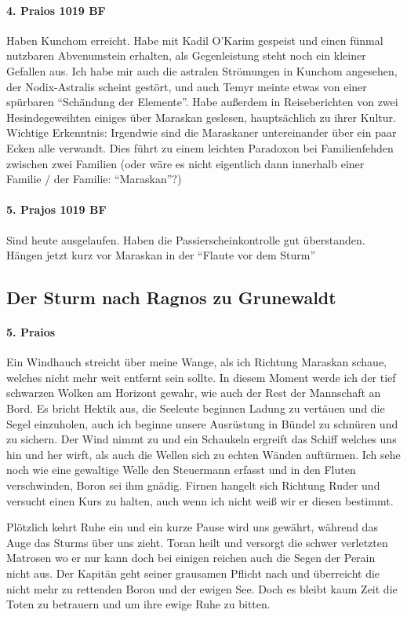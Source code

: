 \paragraph{4. Praios 1019 BF}
Haben Kunchom erreicht. Habe mit Kadil O'Karim gespeist und einen fünmal nutzbaren Abvenumstein erhalten, als Gegenleistung steht noch ein kleiner Gefallen aus.
Ich habe mir auch die astralen Strömungen in Kunchom angesehen, der Nodix-Astralis scheint gestört, und auch Temyr meinte etwas von einer spürbaren ``Schändung der Elemente''.
Habe außerdem in Reiseberichten von zwei Hesindegeweihten einiges über Maraskan geslesen, hauptsächlich zu ihrer Kultur. Wichtige Erkenntnis: Irgendwie sind die Maraskaner untereinander über ein paar Ecken alle verwandt. Dies führt zu einem leichten Paradoxon bei Familienfehden zwischen zwei Familien (oder wäre es nicht eigentlich dann innerhalb einer Familie / der Familie: ``Maraskan''?)

\paragraph{5. Prajos 1019 BF}
Sind heute ausgelaufen. Haben die Passierscheinkontrolle gut überstanden. Hängen jetzt kurz vor Maraskan in der ``Flaute vor dem Sturm''

\subsection{Der Sturm nach Ragnos zu Grunewaldt}

\paragraph{5. Praios}
Ein Windhauch streicht über meine Wange, als ich Richtung Maraskan schaue, welches nicht mehr weit entfernt sein sollte. In diesem Moment werde ich der tief schwarzen Wolken am Horizont gewahr, wie auch der Rest der Mannschaft an Bord. Es bricht Hektik aus, die Seeleute beginnen Ladung zu vertäuen und die Segel einzuholen, auch ich beginne unsere Ausrüstung in Bündel zu schnüren und zu sichern. Der Wind nimmt zu und ein Schaukeln ergreift das Schiff welches uns hin und her wirft, als auch die Wellen sich zu echten Wänden auftürmen. Ich sehe noch wie eine gewaltige Welle den Steuermann erfasst und in den Fluten verschwinden, Boron sei ihm gnädig. Firnen hangelt sich Richtung Ruder und versucht einen Kurs zu halten, auch wenn ich nicht weiß wir er diesen bestimmt. 

Plötzlich kehrt Ruhe ein und ein kurze Pause wird uns gewährt, während das Auge das Sturms über uns zieht. Toran heilt und versorgt die schwer verletzten Matrosen wo er nur kann doch bei einigen reichen auch die Segen der Perain nicht aus. Der Kapitän geht seiner grausamen Pflicht nach und überreicht die nicht mehr zu rettenden Boron und der ewigen See. Doch es bleibt kaum Zeit die Toten zu betrauern und um ihre ewige Ruhe zu bitten. 

